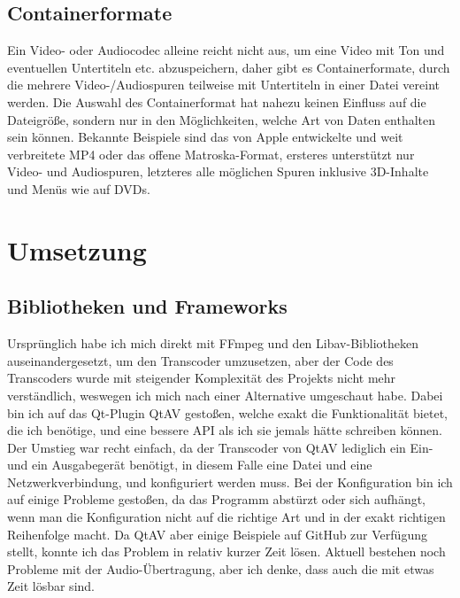 \documentclass{article}
\begin{document}
    \subsection{Containerformate}\label{subsec:containerformate}

    Ein Video- oder Audiocodec alleine reicht nicht aus, um eine Video mit
    Ton und eventuellen Untertiteln etc. abzuspeichern, daher gibt es
    Containerformate, durch die mehrere Video-/Audiospuren teilweise mit
    Untertiteln in einer Datei vereint werden. Die Auswahl des
    Containerformat hat nahezu keinen Einfluss auf die Dateigröße, sondern
    nur in den Möglichkeiten, welche Art von Daten enthalten sein können.
    Bekannte Beispiele sind das von Apple entwickelte und weit verbreitete
    MP4 oder das offene Matroska-Format, ersteres unterstützt nur Video- und
    Audiospuren, letzteres alle möglichen Spuren inklusive 3D-Inhalte und
    Menüs wie auf DVDs.

    \newpage


    \section{Umsetzung}\label{sec:umsetzung}

    \subsection{Bibliotheken und Frameworks}\label{subsec:bibliotheken-und-frameworks}

    Ursprünglich habe ich mich direkt mit FFmpeg und den Libav-Bibliotheken
    auseinandergesetzt, um den Transcoder umzusetzen, aber der Code des
    Transcoders wurde mit steigender Komplexität des Projekts nicht mehr
    verständlich, weswegen ich mich nach einer Alternative umgeschaut habe.
    Dabei bin ich auf das Qt-Plugin QtAV gestoßen, welche exakt die
    Funktionalität bietet, die ich benötige, und eine bessere API als ich
    sie jemals hätte schreiben können. Der Umstieg war recht einfach, da der
    Transcoder von QtAV lediglich ein Ein- und ein Ausgabegerät benötigt, in
    diesem Falle eine Datei und eine Netzwerkverbindung, und konfiguriert
    werden muss. Bei der Konfiguration bin ich auf einige Probleme gestoßen,
    da das Programm abstürzt oder sich aufhängt, wenn man die Konfiguration
    nicht auf die richtige Art und in der exakt richtigen Reihenfolge macht.
    Da QtAV aber einige Beispiele auf GitHub zur Verfügung stellt, konnte
    ich das Problem in relativ kurzer Zeit lösen. Aktuell bestehen noch
    Probleme mit der Audio-Übertragung, aber ich denke, dass auch die mit
    etwas Zeit lösbar sind.
\end{document}
